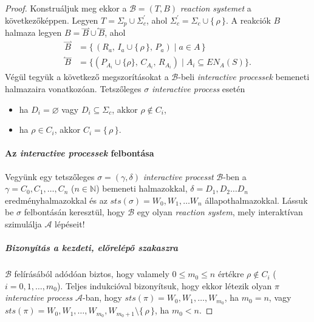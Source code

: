 \documentclass[12pt]{article}
\theoremstyle{definition}
\theoremstyle{remark}
\theoremstyle{plain}
\theoremstyle{plain}
\let\emptyset\varnothing
\newcommand{\forwardhat}{\overset{\rightharpoonup}}
\newcommand{\backwardhat}{\overset{\leftharpoonup}}
\newcommand{\reaction}[3]{
    (#1, \, #2, \, #3)
}
\begin{document}
\begin{proof}
        Konstruáljuk meg ekkor a $\mathscr{B} = (T, B)$ \textit{reaction systemet} a következőképpen. Legyen $T = \Sigma_{p} \cup \Sigma^{\prime}_{c}$, ahol $\Sigma^{\prime}_{c} = \Sigma_{c} \cup \{ \, \rho \, \}$. A reakciók $B$ halmaza legyen $B = \forwardhat B \cup \backwardhat B$, ahol
        \begin{align*}
            \forwardhat B &= \{ \, \reaction{R_{a}}{I_{a} \cup \{ \, \rho \, \}}{P_{a}} \;|\; a \in A \, \} \\
            \backwardhat B &= \{ \reaction{P_{A_{i}} \cup \{ \rho \}}{C_{A_{i}}}{R_{A_{i}}} \;|\; A_{i} \subseteq \textit{EN}_{A}(S) \}.
        \end{align*}
        Végül tegyük a következő megszorításokat a $\mathscr{B}$-beli \textit{interactive processek} bemeneti halmazaira vonatkozóan. Tetszőleges $\sigma$ \textit{interactive process} esetén
        \begin{itemize}
            \item
            ha $D_{i} = \emptyset$ vagy $D_{i} \subseteq \Sigma_{c}$, akkor $\rho \notin C_{i}$,
            \item
            ha $\rho \in C_{i}$, akkor $C_{i} = \{ \,\rho\, \}$.
        \end{itemize}
        
        \paragraph{Az \textit{interactive processek} felbontása}
        Vegyünk egy tetszőleges $\sigma = (\gamma, \delta)$ \textit{interactive processt} $\mathscr{B}$-ben a $\gamma = C_{0}, C_{1}, \ldots, C_{n}$ ($n \in \mathbb{N}$) bemeneti halmazokkal, $\delta = D_{1}, D_{2} \ldots D_{n}$ eredményhalmazokkal és az $\textit{sts}(\sigma) = W_{0},W_{1},\ldots W_{n}$ állapothalmazokkal. Lássuk be $\sigma$ felbontásán keresztül, hogy $\mathscr{B}$ egy olyan \textit{reaction system}, mely interaktívan szimulálja $\mathscr{A}$ lépéseit!

        \subparagraph{Bizonyítás a kezdeti, előrelépő szakaszra}
        $\mathscr{B}$ felírásából adódóan biztos, hogy valamely $0 \leq m_{0} \leq n$ értékre $\rho \notin C_{i}$ ($i = 0, 1, \ldots, m_{0}$). Teljes indukcióval bizonyítsuk, hogy ekkor létezik olyan $\pi$ \textit{interactive process} $\mathscr{A}$-ban, hogy $\textit{sts}(\pi) = W_{0}, W_{1}, \ldots, W_{m_{0}}$, ha $m_{0} = n$, vagy $\textit{sts}(\pi) = W_{0}, W_{1}, \ldots, W_{m_{0}}, W_{m_{0} + 1} \setminus \{ \,\rho\,\}$, ha $m_{0} < n$.
        

\end{proof}
\end{document}
